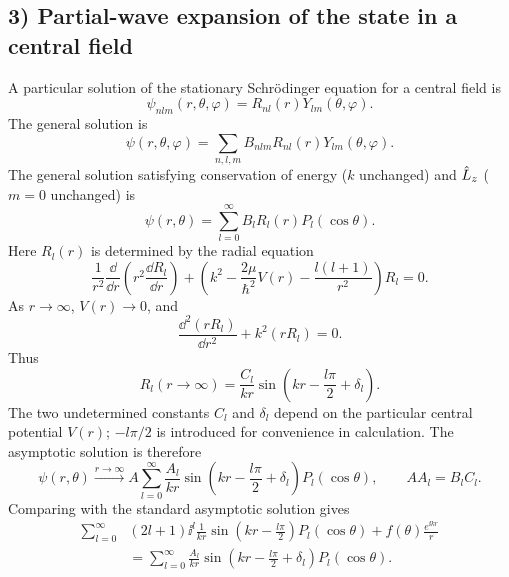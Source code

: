 \subsection*{3) Partial-wave expansion of the state in a central field}
A particular solution of the stationary Schr\"odinger equation for a central field is
\begin{equation}
\psi_{nlm}(r,\theta,\varphi)=R_{nl}(r)Y_{lm}(\theta,\varphi).
\end{equation}
The general solution is
\begin{equation}
\psi(r,\theta,\varphi)=\sum_{n,l,m}B_{nlm}R_{nl}(r)Y_{lm}(\theta,\varphi).
\end{equation}
The general solution satisfying conservation of energy ($k$ unchanged) and $\hat{L}_z$ ($m=0$ unchanged) is
\begin{equation}
\psi(r,\theta)=\sum_{l=0}^\infty B_lR_l(r)P_l(\cos\theta).
\end{equation}
Here $R_l(r)$ is determined by the radial equation
\begin{equation}
\frac1{r^2}\frac{\dd}{\dd r}\left(r^2\frac{\dd R_l}{\dd r}\right)
+\left(k^2-\frac{2\mu}{\hbar^2}V(r)-\frac{l(l+1)}{r^2}\right)R_l=0.
\end{equation}
As $r\to\infty$, $V(r)\to0$, and
\begin{equation}
\frac{\dd^2(rR_l)}{\dd r^2}+k^2(rR_l)=0.
\end{equation}
Thus
\begin{equation}
R_l(r\to\infty)=\frac{C_l}{kr}\sin\left(kr-\frac{l\pi}{2}+\delta_l\right).
\end{equation}
The two undetermined constants $C_l$ and $\delta_l$ depend on the particular central potential $V(r)$; $-l\pi/2$ is introduced for convenience in calculation. The asymptotic solution is therefore
\begin{equation}
\psi(r,\theta)\xrightarrow{r\to\infty}
A\sum_{l=0}^\infty\frac{A_l}{kr}
\sin\left(kr-\frac{l\pi}{2}+\delta_l\right)P_l(\cos\theta),
\qquad AA_l=B_lC_l.
\end{equation}
Comparing with the standard asymptotic solution gives
\begin{equation}\begin{aligned}
\sum_{l=0}^\infty &(2l+1)\ii^l\frac1{kr}
\sin\left(kr-\frac{l\pi}{2}\right)P_l(\cos\theta)
+f(\theta)\frac{e^{\ii kr}}r\\
&=\sum_{l=0}^\infty\frac{A_l}{kr}
\sin\left(kr-\frac{l\pi}{2}+\delta_l\right)P_l(\cos\theta).
\end{aligned}\end{equation}
